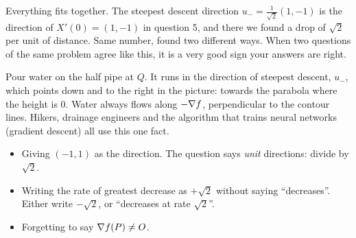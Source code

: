 \begin{center}
\end{center}

\begin{intuition}
Everything fits together. The steepest descent direction $u_-=\frac1{\sqrt2}(1,-1)$ is the direction of
$X'(0)=(1,-1)$ in question 5, and there we found a drop of $\sqrt2$ per unit of distance. Same number,
found two different ways. When two questions of the same problem agree like this, it is a very
good sign your answers are right.
\end{intuition}

\begin{reallife}
Pour water on the half pipe at $Q$. It runs in the direction of steepest descent, $u_-$, which
points down and to the right in the picture: towards the parabola where the height is $0$. Water
always flows along $-\nabla f$, perpendicular to the contour lines. Hikers, drainage engineers and
the algorithm that trains neural networks (gradient descent) all use this one fact.
\end{reallife}

\begin{trap}
\begin{itemize}
  \item Giving $(-1,1)$ as the direction. The question says \emph{unit} directions: divide by $\sqrt2$.
  \item Writing the rate of greatest decrease as $+\sqrt2$ without saying ``decreases''. Either write
        $-\sqrt2$, or ``decreases at rate $\sqrt2$''.
  \item Forgetting to say $\nabla f(P)\ne O$.
\end{itemize}
\end{trap}

